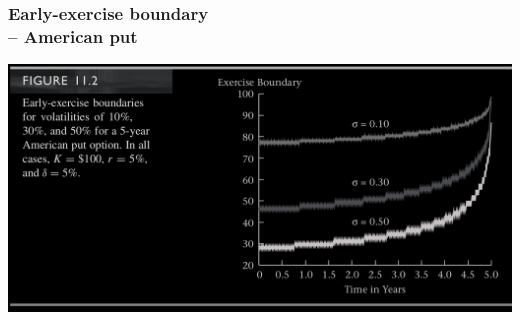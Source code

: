 \begin{frame}[fragile,t]
	\frametitle{Early-exercise boundary \\ -- American put}
	\begin{center}
		\includegraphics[scale=0.25]{figs/Figure-11-2.png}
	\end{center}
\end{frame}

